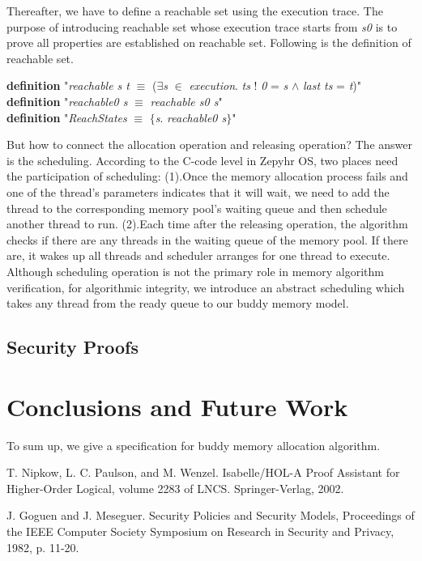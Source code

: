 \documentclass[runningheads]{llncs}
\begin{document}
Thereafter, we have to define a reachable set using the execution trace. The purpose of introducing reachable set whose execution trace starts from \textsl{s0} is to prove all properties are established on reachable set. Following is the definition of reachable set.

\phantom{x} \textbf{definition} "\textsl{reachable s t} $\equiv$ ($\exists$\textsl{s} $\in$ \textsl{execution}. \textsl{ts} ! \textsl{0} = \textsl{s} $\wedge$ \textsl{last ts} = \textsl{t})" \\
\phantom{x} \hspace{3pt} \textbf{definition} "\textsl{reachable0 s} $\equiv$ \textsl{reachable s0 s}" \\
\phantom{x} \hspace{3pt} \textbf{definition} "\textsl{ReachStates} $\equiv$ $\lbrace$\textsl{s}. \textsl{reachable0 s}$\rbrace$"

But how to connect the allocation operation and releasing operation? The answer is the scheduling. According to the C-code level in Zepyhr OS, two places need the participation of scheduling: (1).Once the memory allocation process fails and one of the thread's parameters indicates that it will wait, we need to add the thread to the corresponding memory pool's waiting queue and then schedule another thread to run. (2).Each time after the releasing operation, the algorithm checks if there are any threads in the waiting queue of the memory pool. If there are, it wakes up all threads and scheduler arranges for one thread to execute. Although scheduling operation is not the primary role in memory algorithm verification, for algorithmic integrity, we introduce an abstract scheduling which takes any thread from the ready queue to our buddy memory model.


\subsection{Security Proofs}


\section{Conclusions and Future Work}
To sum up, we give a specification for buddy memory allocation algorithm. 

\begin{thebibliography}{8}
T. Nipkow, L. C. Paulson, and M. Wenzel. Isabelle/HOL-A Proof Assistant for Higher-Order Logical, volume 2283 of LNCS. Springer-Verlag, 2002.

J. Goguen and J. Meseguer. Security Policies and Security Models, Proceedings of the IEEE Computer Society Symposium on Research in Security and Privacy, 1982, p. 11-20.


\end{thebibliography}
\end{document}
